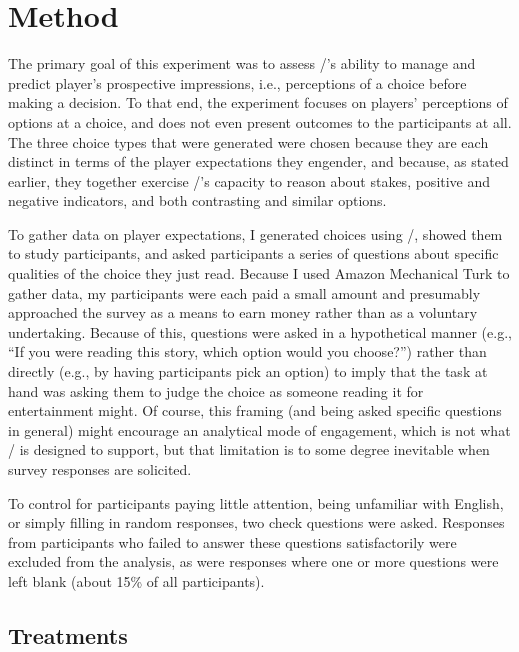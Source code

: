 \section{Method}

\label{sec:e1-method}

The primary goal of this experiment was to assess \dunyazad/'s ability to manage and predict player's prospective impressions, i.e., perceptions of a choice before making a decision.
%
To that end, the experiment focuses on players' perceptions of options at a choice, and does not even present outcomes to the participants at all.
%
The three choice types that were generated were chosen because they are each distinct in terms of the player expectations they engender, and because, as stated earlier, they together exercise \dunyazad/'s capacity to reason about stakes, positive and negative indicators, and both contrasting and similar options.


To gather data on player expectations, I generated choices using \dunyazad/, showed them to study participants, and asked participants a series of questions about specific qualities of the choice they just read.
%
Because I used Amazon Mechanical Turk to gather data, my participants were each paid a small amount and presumably approached the survey as a means to earn money rather than as a voluntary undertaking.
%
Because of this, questions were asked in a hypothetical manner (e.g., ``If you were reading this story, which option would you choose?'') rather than directly (e.g., by having participants pick an option) to imply that the task at hand was asking them to judge the choice as someone reading it for entertainment might.
%
Of course, this framing (and being asked specific questions in general) might encourage an analytical mode of engagement, which is not what \dunyazad/ is designed to support, but that limitation is to some degree inevitable when survey responses are solicited.


To control for participants paying little attention, being unfamiliar with English, or simply filling in random responses, two check questions were asked.
%
Responses from participants who failed to answer these questions satisfactorily were excluded from the analysis, as were responses where one or more questions were left blank (about 15\% of all participants).

\subsection{Treatments}


